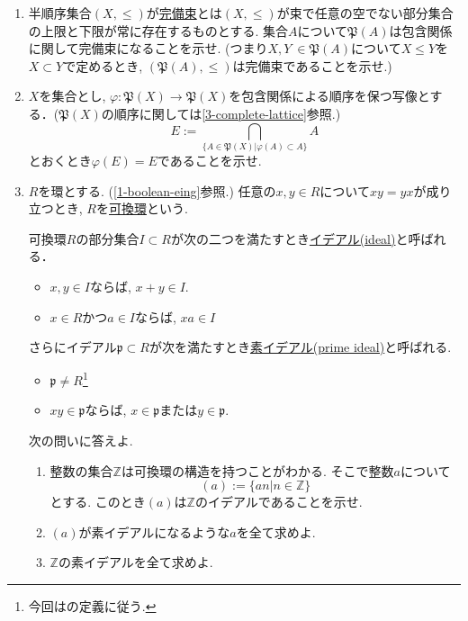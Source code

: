 \documentclass[dvipdfmx,a4paper,11pt]{article}
\newcommand{\Z}{\mathbb{Z}}
\theoremstyle{definition}
\begin{document}
\begin{enumerate}[label=\textbf{問}\ref*{sec-6}.\arabic*]
 
 \item \label{3-complete-lattice}半順序集合$(X, \le)$が\underline{完備束}とは$(X, \le)$が束で任意の空でない部分集合の上限と下限が常に存在するものとする.
集合$A$について$\mathfrak{P}(A)$は包含関係に関して完備束になることを示せ.
(つまり$X, Y\ \in \mathfrak{P}(A)$について$X \le Y$を$X \subset Y$で定めるとき, $(\mathfrak{P}(A), \le)$は完備束であることを示せ.)
 
 \item $X$を集合とし, $\varphi : \mathfrak{P}(X) \to \mathfrak{P}(X)$を包含関係による順序を保つ写像とする．($\mathfrak{P}(X)$の順序に関しては\ref{3-complete-lattice}参照.)
 $$E:=\bigcap_{\{ A \in \mathfrak{P}(X) | \varphi(A) \subset A\}} A$$
 とおくとき$\varphi(E) =E$であることを示せ.
 
 \newpage
 \item $R$を環とする. (\ref{1-boolean-eing}参照.)
任意の$x,y \in R$について$xy=yx$が成り立つとき, $R$を\underline{可換環}という. 

可換環$R$の部分集合$I \subset R$が次の二つを満たすとき\underline{イデアル(ideal)}と呼ばれる．
 \begin{itemize}
 \setlength{\parskip}{0cm}
  \setlength{\itemsep}{0pt}
    \item $x,y \in I$ならば, $x+y \in I$.
    \item $x\in R$かつ$a \in I$ならば, $xa \in I$
\end{itemize}
さらにイデアル$\mathfrak{p}\subset R$が次を満たすとき\underline{素イデアル(prime ideal)}と呼ばれる.
 \begin{itemize}
 \setlength{\parskip}{0cm}
  \setlength{\itemsep}{0pt}
  \item $\mathfrak{p} \neq R$\footnote{今回は\cite{AM}の定義に従う. }
    \item $xy \in \mathfrak{p}$ならば, $x \in \mathfrak{p}$または$y \in \mathfrak{p}$.
\end{itemize}
次の問いに答えよ.  
    \begin{enumerate}[label=(\arabic*).]
 \setlength{\parskip}{0cm}
  \setlength{\itemsep}{0pt}
  \item 整数の集合$\Z$は可換環の構造を持つことがわかる. そこで整数$a$について
  $$
  (a):= \{ an | n \in \Z \}
  $$
  とする. このとき$(a)$は$\Z$のイデアルであることを示せ.
  \item $(a)$が素イデアルになるような$a$を全て求めよ. 
  \item $\Z$の素イデアルを全て求めよ.
  \end{enumerate}
  

\end{enumerate}
\end{document}
